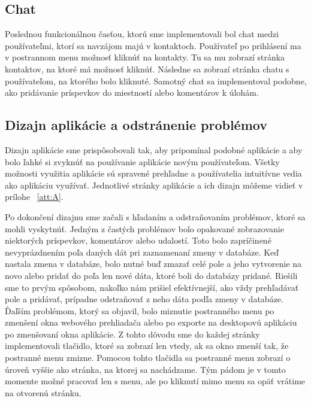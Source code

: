 \subsection{Chat}
\indent Poslednou funkcionálnou časťou, ktorú sme implementovali bol chat medzi používateľmi, ktorí sa navzájom majú v kontaktoch. Používateľ po prihlásení ma v postrannom menu možnosť kliknúť na kontakty. Tu sa mu zobrazí stránka kontaktov, na ktoré má možnosť kliknúť. Následne sa zobrazí stránka chatu s používateľom, na ktorého bolo kliknuté. Samotný chat sa implementoval podobne, ako pridávanie príspevkov do miestností alebo komentárov k úlohám. 

\subsection{Dizajn aplikácie a odstránenie problémov}
\indent Dizajn aplikácie sme prispôsobovali tak, aby pripomínal podobné aplikácie a aby bolo ľahké si zvyknúť na používanie aplikácie novým používateľom. Všetky možnosti využitia aplikácie sú spravené prehľadne a používatelia intuitívne vedia ako aplikáciu využívať. Jednotlivé stránky aplikácie a ich dizajn môžeme vidieť v prílohe ~\ref{att:A}. 

\indent Po dokončení dizajnu sme začali s hľadaním a odstraňovaním problémov, ktoré sa mohli vyskytnúť. Jedným z častých problémov bolo opakované zobrazovanie niektorých príspevkov, komentárov alebo udalostí. Toto bolo zapríčinené nevyprázdnením poľa daných dát pri zaznamenaní zmeny v databáze. Keď nastala zmena v databáze, bolo nutné buď zmazať celé pole a jeho vytvorenie na novo alebo pridať do poľa len nové dáta, ktoré boli do databázy pridané. Riešili sme to prvým spôsobom, nakoľko nám prišiel efektívnejší, ako vždy prehľadávať pole a pridávať, prípadne odstraňovať z neho dáta podľa zmeny v databáze. Ďaľším problémom, ktorý sa objavil, bolo miznutie postranného menu po zmenšení okna webového prehliadača alebo po exporte na desktopovú aplikáciu po zmenšovaní okna aplikácie. Z tohto dôvodu sme do každej stránky implementovali tlačidlo, ktoré sa zobrazí len vtedy, ak sa okno zmenší tak, že postranné menu zmizne. Pomocou tohto tlačidla sa postranné menu zobrazí o úroveň vyššie ako stránka, na ktorej sa nachádzame. Tým pádom je v tomto momente možné pracovať len s menu, ale po kliknutí mimo menu sa opäť vrátime na otvorenú stránku.

